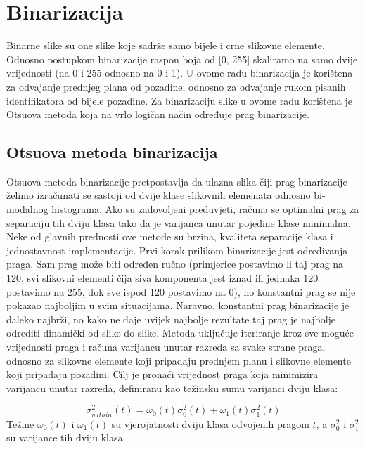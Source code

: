 \documentclass[times, utf8, diplomski]{fer}
\theoremstyle{definition}
\begin{document}
\section{Binarizacija}
Binarne slike su one slike koje sadrže samo bijele i crne slikovne elemente. Odnosno postupkom binarizacije raspon boja od [0, 255] skaliramo na samo dvije vrijednosti (na 0 i 255 odnosno na 0 i 1). U ovome radu binarizacija je korištena za odvajanje prednjeg plana od pozadine, odnosno za odvajanje rukom pisanih identifikatora od bijele pozadine. Za binarizaciju slike u ovome radu korištena je Otsuova metoda koja na vrlo logičan način određuje prag binarizacije.
\subsection{Otsuova metoda binarizacija}
Otsuova metoda binarizacije pretpostavlja da ulazna slika čiji prag binarizacije želimo izračunati se sastoji od dvije klase slikovnih elemenata odnosno bi-modalnog histograma. Ako su zadovoljeni preduvjeti, računa se optimalni prag za separaciju tih dviju klasa tako da je varijanca unutar pojedine klase minimalna. Neke od glavnih prednosti ove metode su brzina, kvaliteta separacije klasa i jednostavnost implementacije.
\newline
\newline
Prvi korak prilikom binarizacije jest određivanja praga. Sam prag može biti određen ručno (primjerice postavimo li taj prag na 120, svi slikovni elementi čija siva komponenta jest iznad ili jednaka 120 postavimo na 255, dok sve ispod 120 postavimo na 0), no konstantni prag se nije pokazao najboljim u svim situacijama. Naravno, konstantni prag binarizacije je daleko najbrži, no kako ne daje uvijek najbolje rezultate taj prag je najbolje odrediti dinamički od slike do slike.
Metoda uključuje iteriranje kroz sve moguće vrijednosti praga i računa varijancu unutar razreda sa svake strane praga, odnosno za slikovne elemente koji pripadaju prednjem planu i slikovne elemente koji pripadaju pozadini. Cilj je pronaći vrijednost praga koja minimizira varijancu unutar razreda, definiranu kao težinsku sumu varijanci dviju klasa:

\begin{equation}
\sigma^2_{within}(t) = \omega_0(t)\sigma_0^2(t) + \omega_1(t)\sigma_1^2(t)
\end{equation}
Težine $\omega_0(t)$ i $\omega_1(t)$ su vjerojatnosti dviju klasa odvojenih pragom $t$, a $\sigma_0^2$ i $\sigma_1^2$ su varijance tih dviju klasa.
\end{document}
